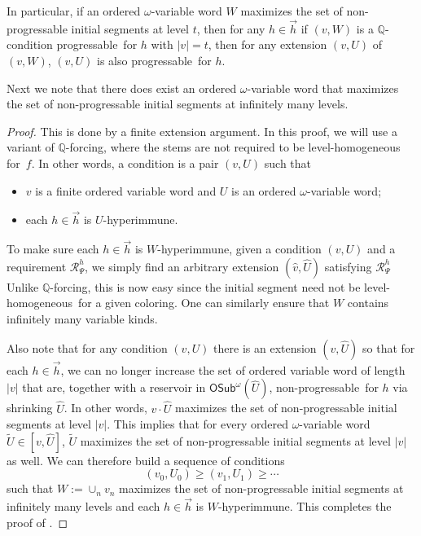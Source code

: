 \documentclass{article}
\def\mcal{\mathcal}
\def\h{\hat}
\def\t{\tilde}
\def\sectionallymonochromatic{level-homogeneous}
\def\nonprogressable{non-progressable}
\def\progressable{progressable}
\def\QQ{\mathbb{Q}}
\newcommand{\OSub}{\mathsf{OSub}}
\numberwithin{theorem}{section}
\newtheorem{proposition}[theorem]{Proposition}
\theoremstyle{definition}
\begin{document}
In particular, if an ordered $\omega$-variable word $W$ maximizes the set of non-progress\-able initial segments at level
$t$, then for any $h\in\vec{h}$ if $(v,W)$ is a  $\QQ$-condition \progressable\ for $h$ with $|v| = t$,
then for any extension $(v,U) $ of $(v,W)$,
$(v,U)$ is also \progressable\ for $h$.



Next we note that there does exist an ordered $\omega$-variable word
that maximizes the set of non-progressable initial segments at infinitely many levels.

\begin{proof}
This is done by a finite extension argument.
In this proof, we will use a variant of $\QQ$-forcing, where the stems are not required to be level-homogeneous for~$f$. In other words, a condition is a pair $(v, U)$ such that
\begin{itemize}
    \item[(1)] $v$ is a finite ordered variable word and $U$ is an ordered $\omega$-variable word;
    \item[(2)] each $h\in\vec{h}$ is  $U$-hyperimmune.
\end{itemize}
To make sure each $h\in\vec{h}$ is $W$-hyperimmune, given a condition $(v,U)$
and a requirement $\mcal R_\Psi^h$,
we simply find an arbitrary extension $(\h v,\h U)$
satisfying $\mcal R_\Psi^h$
Unlike $\QQ$-forcing, this is now easy since the initial segment need not
be \sectionallymonochromatic\ for a given coloring.
One can similarly ensure that $W$ contains infinitely many variable kinds.

Also note that for any condition $(v,U)$ there is an extension
$(v,\h U)$ so that for each $h\in\vec{h}$, we can no longer increase the set of
ordered variable word  of length $|v|$
that are, together with a reservoir in $\OSub^\omega(\h U)$, \nonprogressable\
for $h$
via shrinking $\h U$.
In other words,
$v\cdot\h U$ maximizes the set of non-progressable initial segments at level $|v|$.
This implies that for every ordered $\omega$-variable word $\t U\in [v,\h U]$,
$\t U$ maximizes the set of non-progressable initial segments at level $|v|$ as well.
We can therefore build a sequence of conditions 
$$
(v_0,U_0)\geq (v_1,U_1)\geq\cdots
$$
such that
$W:= \cup_n v_n$ maximizes the set of non-progressable initial segments at infinitely many levels and each $h \in \vec{h}$ is $W$-hyperimmune.
This completes the proof of \Cref{scaOVW-prop30}.
\end{proof}
\end{document}
